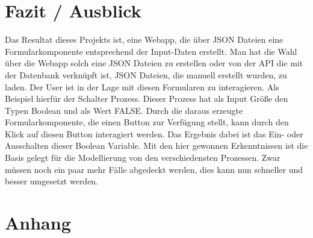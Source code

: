 \documentclass[a4paper,11pt]{scrreprt}
\begin{document}
\chapter{Fazit / Ausblick}
Das Resultat dieses Projekts ist, eine Webapp, die über JSON Dateien eine Formularkomponente entsprechend der Input-Daten erstellt. Man hat die Wahl über  die Webapp solch eine JSON Dateien zu erstellen oder von der API die mit der Datenbank verknüpft ist, JSON Dateien, die manuell erstellt wurden, zu laden. Der User ist in der Lage mit diesen Formularen zu interagieren. Als Beispiel hierfür der Schalter Prozess. Dieser Prozess hat als Input Größe den Typen Boolean und als Wert FALSE. Durch die daraus erzeugte Formularkomponente, die einen Button zur Verfügung stellt, kann durch den Klick auf diesen Button interagiert werden. Das Ergebnis dabei ist das Ein- oder Ausschalten dieser Boolean Variable. Mit den hier gewonnen Erkenntnissen ist die Basis gelegt für die Modellierung von den verschiedensten Prozessen. Zwar müssen noch ein paar mehr Fälle abgedeckt werden, dies kann nun schneller und besser umgesetzt werden. 




\chapter{Anhang}

\newpage
\listoffigures

\newpage

\end{document}

